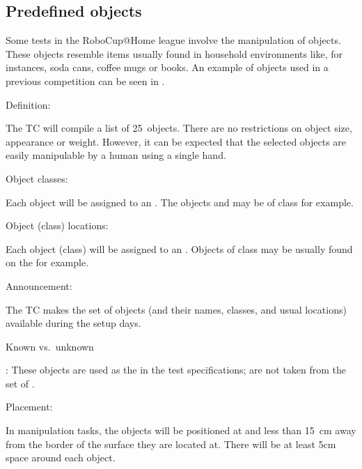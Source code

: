 \subsection{Predefined objects}
\label{rule:scenario_objects}

\def\NumObjects{25\ }
\def\NumLocations{20\ }
\def\NumNames{20\ }

Some tests in the RoboCup@Home league involve the manipulation of objects. These objects resemble items usually found in household environments like, for instances, soda cans, coffee mugs or books. An example of objects used in a previous competition can be seen in .

\begin{enumerate}
	{\bf\item Definition:} The TC will compile a list of \NumObjects objects. There are no restrictions on object size, appearance or weight. %
	However, it can be expected that the selected objects are easily manipulable by a human using a single hand.
	{\bf\item Object classes:} Each object will be assigned to an . The objects  and  may be of class  for example.

	{\bf\item Object (class) locations:} Each object (class) will be assigned to an . Objects of class  may be usually found on the  for example.

	{\bf\item Announcement:} The TC makes the set of objects (and their names, classes, and usual locations) available during the setup days.

	{\bf\item Known vs.\ unknown}: These objects are used as the  in the test specifications;  are not taken from the set of . 
	
	{\bf\item Placement:} In manipulation tasks, the objects will be positioned at  and less than \SI{15}{\centi\meter} away from the border of the surface they are located at. There will be at least 5cm space around each object.
\end{enumerate}



